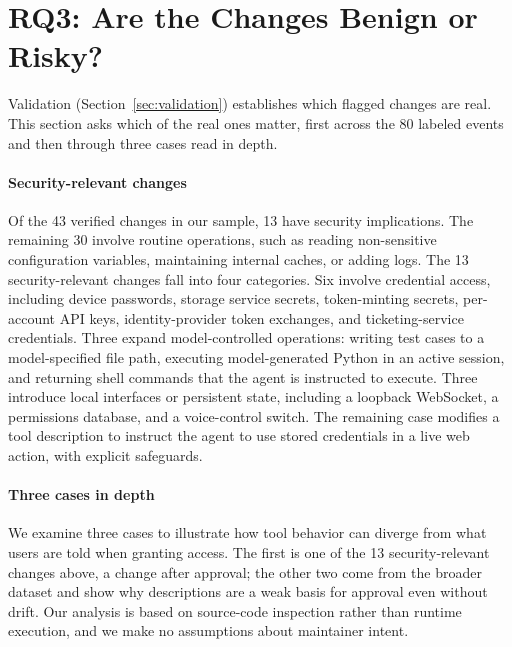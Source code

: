 \section{RQ3: Are the Changes Benign or Risky?}\label{sec:rq3}\label{sec:cases}

Validation (Section~\ref{sec:validation}) establishes which flagged changes are real. This section asks which of the real ones matter, first across the 80 labeled events and then through three cases read in depth.

\paragraph{Security-relevant changes}
Of the 43 verified changes in our sample, 13 have security implications. The remaining 30 involve routine operations, such as reading non-sensitive configuration variables, maintaining internal caches, or adding logs. The 13 security-relevant changes fall into four categories. Six involve credential access, including device passwords, storage service secrets, token-minting secrets, per-account API keys, identity-provider token exchanges, and ticketing-service credentials. Three expand model-controlled operations: writing test cases to a model-specified file path, executing model-generated Python in an active session, and returning shell commands that the agent is instructed to execute. Three introduce local interfaces or persistent state, including a loopback WebSocket, a permissions database, and a voice-control switch. The remaining case modifies a tool description to instruct the agent to use stored credentials in a live web action, with explicit safeguards.

\paragraph{Three cases in depth}
We examine three cases to illustrate how tool behavior can diverge from what users are told when granting access. The first is one of the 13 security-relevant changes above, a change after approval; the other two come from the broader dataset and show why descriptions are a weak basis for approval even without drift. Our analysis is based on source-code inspection rather than runtime execution, and we make no assumptions about maintainer intent.

